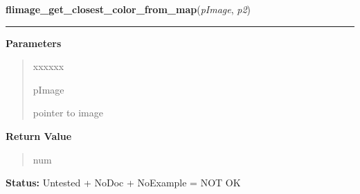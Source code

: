 \hspace{.8\funcindent}\begin{boxedminipage}{\funcwidth}

    \raggedright \textbf{flimage\_get\_closest\_color\_from\_map}(\textit{pImage}, \textit{p2})

    \vspace{-1.5ex}

    \rule{\textwidth}{0.5\fboxrule}
\setlength{\parskip}{2ex}
\setlength{\parskip}{1ex}
      \textbf{Parameters}
      \vspace{-1ex}

      \begin{quote}
        \begin{Ventry}{xxxxxx}

          \item[pImage]

          pointer to image

        \end{Ventry}

      \end{quote}

      \textbf{Return Value}
    \vspace{-1ex}

      \begin{quote}
      num

      \end{quote}

\textbf{Status:} Untested + NoDoc + NoExample = NOT OK



    \end{boxedminipage}

    \label{xformslib:library:flimage_get_linearlut}

    \vspace{0.5ex}

